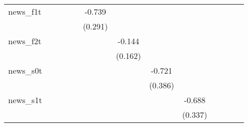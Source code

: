 {\begin{tabular}{l*{12}{c}}
\addlinespace
news\_f1t    &                     &                     &                     &                     &      -0.739\sym{**} &                     &                     &                     &                     &                     &                     &                     \\
            &                     &                     &                     &                     &     (0.291)         &                     &                     &                     &                     &                     &                     &                     \\
\addlinespace
news\_f2t    &                     &                     &                     &                     &                     &      -0.144         &                     &                     &                     &                     &                     &                     \\
            &                     &                     &                     &                     &                     &     (0.162)         &                     &                     &                     &                     &                     &                     \\
\addlinespace
news\_s0t    &                     &                     &                     &                     &                     &                     &      -0.721\sym{*}  &                     &                     &                     &                     &                     \\
            &                     &                     &                     &                     &                     &                     &     (0.386)         &                     &                     &                     &                     &                     \\
\addlinespace
news\_s1t    &                     &                     &                     &                     &                     &                     &                     &      -0.688\sym{**} &                     &                     &                     &                     \\
            &                     &                     &                     &                     &                     &                     &                     &     (0.337)         &                     &                     &                     &                     \\

\end{tabular}}
